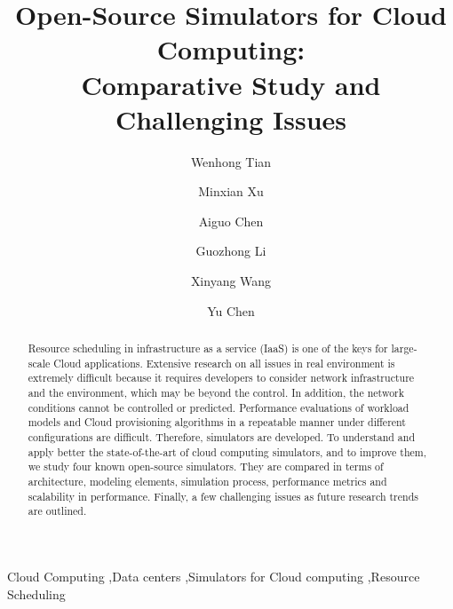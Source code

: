 \documentclass[3p, twocolumn]{elsarticle}
\begin{document}
\title{Open-Source Simulators for Cloud Computing: \\
Comparative Study and Challenging Issues}
\author[rvt]{Wenhong Tian}
\author[rvt]{Minxian Xu}
\author[rvt1]{Aiguo Chen}
\author[rvt]{Guozhong Li}
\author[rvt]{Xinyang Wang}
\author[rvt]{Yu Chen}

\address[rvt]{School of Information and Software Engineering, University of Electronic Science and Technology of China,China}
\address[rvt1]{School Of Computer Science and Engineering, University of Electronic Science and Technology of China,China}



\begin{abstract}


Resource scheduling in infrastructure as a service (IaaS) is one of the keys for large-scale Cloud applications. Extensive research on all issues in real environment is extremely difficult because it requires developers to consider network infrastructure and the environment, which may be beyond the control. In addition, the network conditions cannot be controlled or predicted. Performance evaluations of workload models and Cloud provisioning algorithms in a repeatable manner under different configurations are difficult. Therefore, simulators are developed.  To understand and apply better the state-of-the-art of  cloud computing simulators, and to improve them, we study four  known open-source simulators.
They are compared in terms of architecture, modeling elements, simulation process, performance metrics and scalability in performance. Finally, a few challenging issues as future research trends are outlined.
\end{abstract}


\begin{keyword}
Cloud Computing \sep Data centers \sep Simulators for Cloud computing \sep Resource Scheduling
\end{keyword}
\maketitle
\end{document}
